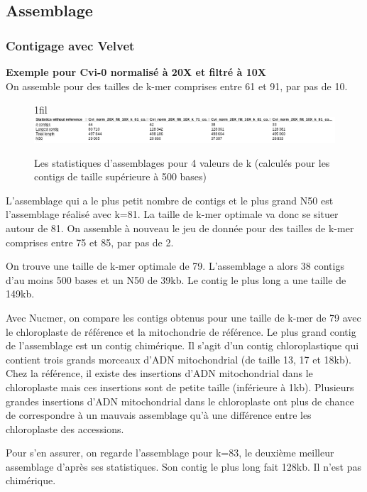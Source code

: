 \documentclass[a4paper]{article}
\makeatletter
\newcommand*{\centerfloat}{%
  \parindent \z@
  \leftskip \z@ \@plus 1fil \@minus \textwidth
  \rightskip\leftskip
  \parfillskip \z@skip}
\makeatother
\begin{document}
\subsection{Assemblage}

\subsubsection{Contigage avec Velvet}
\hspace{1.5cm}  \textbf{\small Exemple pour Cvi-0 normalisé à 20X et filtré à 10X}\\

On assemble pour des tailles de k-mer comprises entre 61 et 91, par pas de 10. 

\begin{figure}[H]
\centerfloat
\includegraphics[scale=0.4] {Assemblage/quast.png}
\caption{Les statistiques d'assemblages pour 4 valeurs de k (calculés pour les contigs de taille supérieure à 500 bases)}
\label{quast}
\end{figure}

L'assemblage qui a le plus petit nombre de contigs et le plus grand N50 est l'assemblage réalisé avec k=81. La taille de k-mer optimale va donc se situer autour de 81. On assemble à nouveau le jeu de donnée pour des tailles de k-mer comprises entre 75 et 85, par pas de 2.

On trouve une taille de k-mer optimale de 79. L'assemblage a alors 38 contigs d'au moins 500 bases et un N50 de 39kb. Le contig le plus long a une taille de 149kb. 

Avec Nucmer, on compare les contigs obtenus pour une taille de k-mer de 79 avec le chloroplaste de référence et la mitochondrie de référence. Le plus grand contig de l'assemblage est un contig chimérique. Il s'agit d'un contig chloroplastique qui contient trois grands morceaux d'ADN mitochondrial (de taille 13, 17 et 18kb). Chez la référence, il existe des insertions d'ADN mitochondrial dans le chloroplaste  mais ces insertions sont de petite taille (inférieure à 1kb). Plusieurs grandes insertions d'ADN mitochondrial dans le chloroplaste ont plus de chance de correspondre à un mauvais assemblage qu'à une différence entre les chloroplaste des accessions. 

Pour s'en assurer, on regarde l'assemblage pour k=83\label{Velvet_norm}, le deuxième meilleur assemblage d'après ses statistiques. Son contig le plus long fait 128kb. Il n'est pas chimérique.
\end{document}
